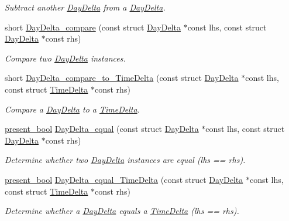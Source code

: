 \begin{DoxyCompactItemize}
\begin{DoxyCompactList}\small\item\em Subtract another \hyperlink{structDayDelta}{Day\-Delta} from a \hyperlink{structDayDelta}{Day\-Delta}. \end{DoxyCompactList}\item 
short \hyperlink{day-delta_8h_a8650c9eb43eeaa2942720be2afc33131}{Day\-Delta\-\_\-compare} (const struct \hyperlink{structDayDelta}{Day\-Delta} $\ast$const lhs, const struct \hyperlink{structDayDelta}{Day\-Delta} $\ast$const rhs)
\begin{DoxyCompactList}\small\item\em Compare two \hyperlink{structDayDelta}{Day\-Delta} instances. \end{DoxyCompactList}\item 
short \hyperlink{day-delta_8h_aff276e117d9389d90ff1e6603f83ace4}{Day\-Delta\-\_\-compare\-\_\-to\-\_\-\-Time\-Delta} (const struct \hyperlink{structDayDelta}{Day\-Delta} $\ast$const lhs, const struct \hyperlink{structTimeDelta}{Time\-Delta} $\ast$const rhs)
\begin{DoxyCompactList}\small\item\em Compare a \hyperlink{structDayDelta}{Day\-Delta} to a \hyperlink{structTimeDelta}{Time\-Delta}. \end{DoxyCompactList}\item 
\hyperlink{types_8h_a1c24e2cdd988b886e889080ded176ae0}{present\-\_\-bool} \hyperlink{day-delta_8h_aec7bbfd9ee83f64b94117028c4d856f5}{Day\-Delta\-\_\-equal} (const struct \hyperlink{structDayDelta}{Day\-Delta} $\ast$const lhs, const struct \hyperlink{structDayDelta}{Day\-Delta} $\ast$const rhs)
\begin{DoxyCompactList}\small\item\em Determine whether two \hyperlink{structDayDelta}{Day\-Delta} instances are equal (lhs == rhs). \end{DoxyCompactList}\item 
\hyperlink{types_8h_a1c24e2cdd988b886e889080ded176ae0}{present\-\_\-bool} \hyperlink{day-delta_8h_a98019c10b9bcf7ec5eb6055c4b677e94}{Day\-Delta\-\_\-equal\-\_\-\-Time\-Delta} (const struct \hyperlink{structDayDelta}{Day\-Delta} $\ast$const lhs, const struct \hyperlink{structTimeDelta}{Time\-Delta} $\ast$const rhs)
\begin{DoxyCompactList}\small\item\em Determine whether a \hyperlink{structDayDelta}{Day\-Delta} equals a \hyperlink{structTimeDelta}{Time\-Delta} (lhs == rhs). \end{DoxyCompactList}\item 

\end{DoxyCompactItemize}
